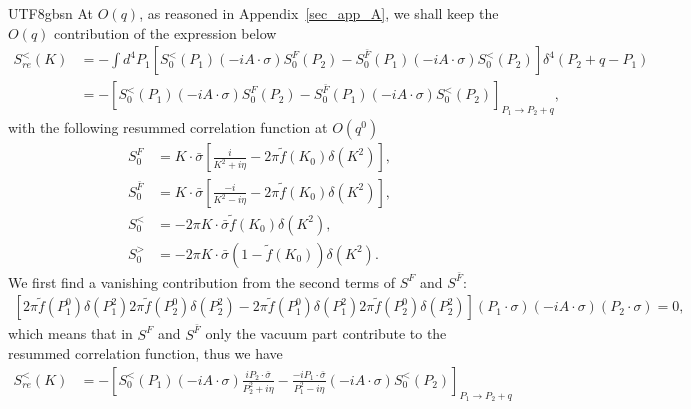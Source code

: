 \documentclass[11pt]{article}\def\baselinestretch{1.4}
\begin{document}
\begin{CJK}{UTF8}{gbsn}
At $O(q)$, as reasoned in Appendix~\ref{sec_app_A}, we shall keep the $O(q)$ contribution of the expression below
\begin{align}
S^<_{re}(K) &= -\int d^4P_1 \left[ S_0^<(P_1)(-iA\cdot \sigma )S_0^F(P_2)-S_0^{\bar{F}}(P_1)(-iA\cdot \sigma )S_0^<(P_2) \right] \delta ^4(P_2+q-P_1) \nonumber\\
&= -\left[S_0^<(P_1)(-iA\cdot \sigma )S_0^F(P_2)-S_0^{\bar{F}}(P_1)(-iA\cdot \sigma )S_0^<(P_2)\right]_{P_1\to P_2+q},
\end{align}
with the following resummed correlation function at $O(q^0)$
\begin{equation}
\begin{aligned}
S^F_0 &= K\cdot \bar{\sigma}\left[ \frac{i}{K^2+i \eta }-2\pi \tilde{f}(K_0)\delta (K^2) \right] ,\\
S^{\bar{F}}_0 &= K\cdot \bar{\sigma}\left[ \frac{-i}{K^2-i \eta }-2\pi \tilde{f}(K_0)\delta (K^2) \right] ,\\
S^<_0 &= -2\pi K\cdot \bar{\sigma}\tilde{f}(K_0)\delta (K^2) ,\\
S^>_0 &= -2\pi K\cdot \bar{\sigma}(1-\tilde{f}(K_0))\delta (K^2).
\end{aligned}
\end{equation}
We first find a vanishing contribution from the second terms of $S^F$ and $S^{\bar{F}}$:
\begin{align}
\left[ 2\pi \tilde{f}(P_1^0)\delta (P_1^2)2\pi \tilde{f}(P_2^0)\delta (P_2^2)-2\pi \tilde{f}(P_1^0)\delta (P_1^2)2\pi \tilde{f}(P_2^0)\delta (P_2^2) \right](P_1 \cdot \sigma )(-iA \cdot \sigma )(P_2 \cdot \sigma ) = 0,
\end{align}
which means that in $S^F$ and $S^{\bar{F}}$ only the vacuum part contribute to the resummed correlation function, thus we have %
\begin{align}
S^<_{re}(K) &= -\left[S_0^<(P_1)(-iA\cdot \sigma )\frac{iP_2\cdot \bar{\sigma }}{P_2^2+i \eta }-\frac{-iP_1\cdot \bar{\sigma }}{P_1^2-i \eta }(-iA\cdot \sigma )S_0^<(P_2)\right]_{P_1\to P_2+q}\nonumber\\

\end{align}
\end{CJK}
\end{document}

